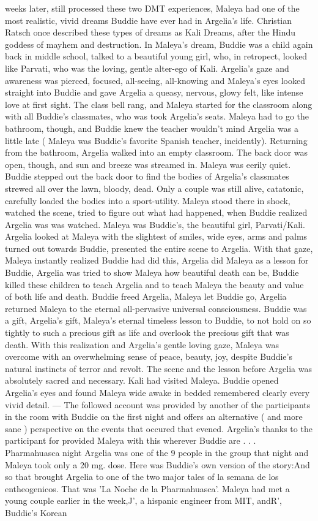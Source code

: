 \documentclass[12pt]{book}
\begin{document}
weeks later, still processed these two DMT experiences, Maleya had one of the most realistic, vivid dreams Buddie have ever had in Argelia's life. Christian Ratsch once described these types of dreams as Kali Dreams, after the Hindu goddess of mayhem and destruction. In Maleya's dream, Buddie was a child again back in middle school, talked to a beautiful young girl, who, in retropect, looked like Parvati, who was the loving, gentle alter-ego of Kali. Argelia's gaze and awareness was pierced, focused, all-seeing, all-knowing and Maleya's eyes looked straight into Buddie and gave Argelia a queasy, nervous, glowy felt, like intense love at first sight. The class bell rang, and Maleya started for the classroom along with all Buddie's classmates, who was took Argelia's seats. Maleya had to go the bathroom, though, and Buddie knew the teacher wouldn't mind Argelia was a little late ( Maleya was Buddie's favorite Spanish teacher, incidently). Returning from the bathroom, Argelia walked into an empty classroom. The back door was open, though, and sun and breeze was streamed in. Maleya was eerily quiet. Buddie stepped out the back door to find the bodies of Argelia's classmates strewed all over the lawn, bloody, dead. Only a couple was still alive, catatonic, carefully loaded the bodies into a sport-utility. Maleya stood there in shock, watched the scene, tried to figure out what had happened, when Buddie realized Argelia was was watched. Maleya was Buddie's, the beautiful girl, Parvati/Kali. Argelia looked at Maleya with the slightest of smiles, wide eyes, arms and palms turned out towards Buddie, presented the entire scene to Argelia. With that gaze, Maleya instantly realized Buddie had did this, Argelia did Maleya as a lesson for Buddie, Argelia was tried to show Maleya how beautiful death can be, Buddie killed these children to teach Argelia and to teach Maleya the beauty and value of both life and death. Buddie freed Argelia, Maleya let Buddie go, Argelia returned Maleya to the eternal all-pervasive universal consciousness. Buddie was a gift, Argelia's gift, Maleya's eternal timeless lesson to Buddie, to not hold on so tightly to such a precious gift as life and overlook the precious gift that was death. With this realization and Argelia's gentle loving gaze, Maleya was overcome with an overwhelming sense of peace, beauty, joy, despite Buddie's natural instincts of terror and revolt. The scene and the lesson before Argelia was absolutely sacred and necessary. Kali had visited Maleya. Buddie opened Argelia's eyes and found Maleya wide awake in bedded remembered clearly every vivid detail. --- The followed account was provided by another of the participants in the room with Buddie on the first night and offers an alternative ( and more sane ) perspective on the events that occured that evened. Argelia's thanks to the participant for provided Maleya with this wherever Buddie are . . .  Pharmahuasca night Argelia was one of the 9 people in the group that night and Maleya took only a 20 mg. dose. Here was Buddie's own version of the story:And so that brought Argelia to one of the two major tales of la semana de los entheogenicos. That was 'La Noche de la Pharmahuasca'. Maleya had met a young couple earlier in the week,J', a hispanic engineer from MIT, andR', Buddie's Korean 
\end{document}
